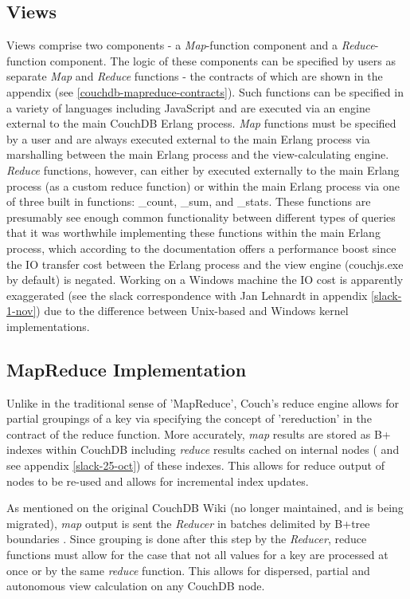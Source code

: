 \subsection{Views}
Views comprise two components - a \textit{Map}-function component and a \textit{Reduce}-function component. The logic of these components can be specified by users as separate \textit{Map} and \textit{Reduce} functions - the contracts of which are shown in the appendix (see \ref{couchdb-mapreduce-contracts}). Such functions can be specified in a variety of languages including JavaScript and are executed via an engine external to the main CouchDB Erlang process. \textit{Map} functions must be specified by a user and are always executed external to the main Erlang process via marshalling between the main Erlang process and the view-calculating engine. \textit{Reduce} functions, however, can either by executed externally to the main Erlang process (as a custom reduce function) or within the main Erlang process via one of three built in functions: \_count, \_sum, and \_stats. These functions are presumably see enough common functionality between different types of queries that it was worthwhile implementing these functions within the main Erlang process, which according to the documentation offers a performance boost since the IO transfer cost between the Erlang process and the view engine (couchjs.exe by default) is negated. Working on a Windows machine the IO cost is apparently exaggerated (see the slack correspondence with Jan Lehnardt in appendix \ref{slack-1-nov}) due to the difference between Unix-based and Windows kernel implementations.

\subsection{MapReduce Implementation}
Unlike in the traditional sense of 'MapReduce', Couch's reduce engine allows for partial groupings of a key via specifying the concept of 'rereduction' in the contract of the reduce function. More accurately, \textit{map} results are stored as B+ indexes within CouchDB including \textit{reduce} results cached on internal nodes (\cite{reduceFunctions} and see appendix \ref{slack-25-oct}) of these indexes. This allows for reduce output of nodes to be re-used and allows for incremental index updates.

As mentioned on the original CouchDB Wiki (no longer maintained, and is being migrated), \textit{map} output is sent the \textit{Reducer} in batches delimited by B+tree boundaries \cite{couchwiki}. Since grouping is done after this step by the \textit{Reducer}, reduce functions must allow for the case that not all values for a key are processed at once or by the same \textit{reduce} function. This allows for dispersed, partial and autonomous view calculation on any CouchDB node.

